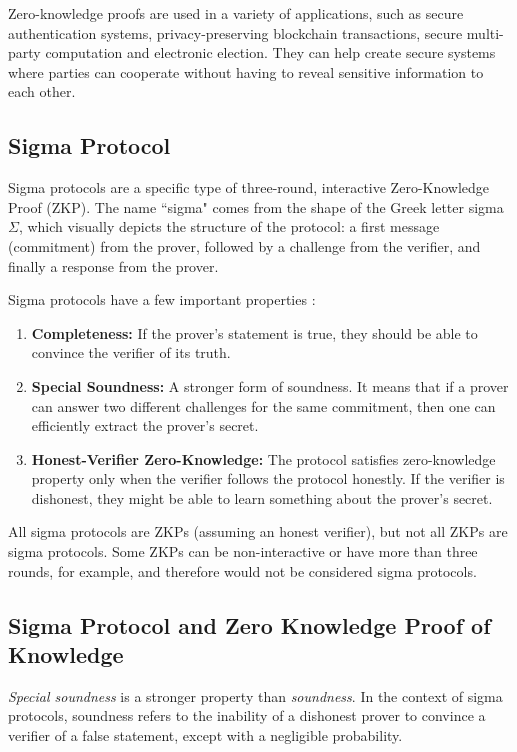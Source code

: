 Zero-knowledge proofs are used in a variety of applications, such as secure authentication systems, privacy-preserving blockchain transactions, secure multi-party computation and electronic election. They can help create secure systems where parties can cooperate without having to reveal sensitive information to each other.

\subsection{Sigma Protocol}
Sigma protocols are a specific type of three-round, interactive Zero-Knowledge Proof (ZKP). The name ``sigma" comes from the shape of the Greek letter sigma $\Sigma$, which visually depicts the structure of the protocol: a first message (commitment) from the prover, followed by a challenge from the verifier, and finally a response from the prover. 

Sigma protocols have a few important properties \cite{damgaard2010sigma}:

\begin{enumerate}
    \item \textbf{Completeness:} If the prover's statement is true, they should be able to convince the verifier of its truth.
    \item \textbf{Special Soundness:} A stronger form of soundness. It means that if a prover can answer two different challenges for the same commitment, then one can efficiently extract the prover's secret.
    \item \textbf{Honest-Verifier Zero-Knowledge:} The protocol satisfies zero-knowledge property only when the verifier follows the protocol honestly. If the verifier is dishonest, they might be able to learn something about the prover's secret.
\end{enumerate}

All sigma protocols are ZKPs (assuming an honest verifier), but not all ZKPs are sigma protocols. Some ZKPs can be non-interactive or have more than three rounds, for example, and therefore would not be considered sigma protocols.

\subsection{Sigma Protocol and Zero Knowledge Proof of Knowledge}

\textit{Special soundness} is a stronger property than \textit{soundness}. In the context of sigma protocols, soundness refers to the inability of a dishonest prover to convince a verifier of a false statement, except with a negligible probability. 

